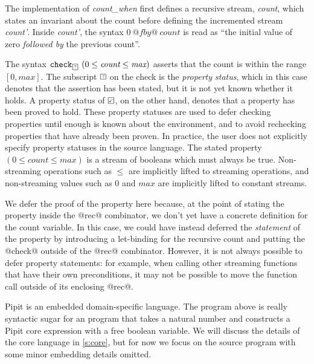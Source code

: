 The implementation of \emph{count_when} first defines a recursive stream, \emph{count}, which states an invariant about the count before defining the incremented stream \emph{count'}.
Inside \emph{count'}, the syntax $0~@fby@~\textit{count}$ is read as ``the initial value of zero \emph{followed by} the previous count''.

The syntax $\xcheckP{\PSUnknown}{(0 \le \textit{count} \le \textit{max})}$ asserts that the count is within the range $[0, \textit{max}]$.
The subscript $\PSUnknown$ on the check is the \emph{property status}, which in this case denotes that the assertion has been stated, but it is not yet known whether it holds.
A property status of $\PSValid$, on the other hand, denotes that a property has been proved to hold.
These property statuses are used to defer checking properties until enough is known about the environment, and to avoid rechecking properties that have already been proven.
In practice, the user does not explicitly specify property statuses in the source language.
The stated property $(0 \le \textit{count} \le \textit{max})$ is a stream of booleans which must always be true.
Non-streaming operations such as $\le$ are implicitly lifted to streaming operations, and non-streaming values such as $0$ and $\textit{max}$ are implicitly lifted to constant streams.

We defer the proof of the property here because, at the point of stating the property inside the @rec@ combinator, we don't yet have a concrete definition for the count variable.
In this case, we could have instead deferred the \emph{statement} of the property by introducing a let-binding for the recursive count and putting the @check@ outside of the @rec@ combinator.
However, it is not always possible to defer property statements: for example, when calling other streaming functions that have their own preconditions, it may not be possible to move the function call outside of its enclosing @rec@.

Pipit is an embedded domain-specific language.
The program above is really syntactic sugar for an \fstar{} program that takes a natural number and constructs a Pipit core expression with a free boolean variable.
We will discuss the details of the core language in \autoref{s:core}, but for now we focus on the source program with some minor embedding details omitted.

